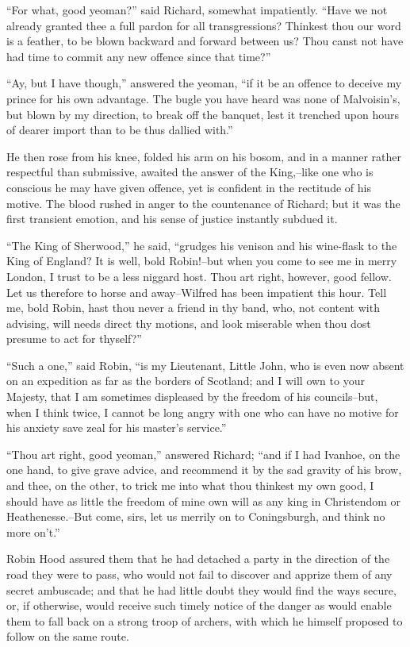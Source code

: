 ``For what, good yeoman?'' said Richard, somewhat impatiently. ``Have we
not already granted thee a full pardon for all transgressions? Thinkest
thou our word is a feather, to be blown backward and forward between us?
Thou canst not have had time to commit any new offence since that
time?''

``Ay, but I have though,'' answered the yeoman, ``if it be an offence to
deceive my prince for his own advantage. The bugle you have heard was
none of Malvoisin's, but blown by my direction, to break off the
banquet, lest it trenched upon hours of dearer import than to be thus
dallied with.''

He then rose from his knee, folded his arm on his bosom, and in a manner
rather respectful than submissive, awaited the answer of the King,--like
one who is conscious he may have given offence, yet is confident in the
rectitude of his motive. The blood rushed in anger to the countenance of
Richard; but it was the first transient emotion, and his sense of
justice instantly subdued it.

``The King of Sherwood,'' he said, ``grudges his venison and his
wine-flask to the King of England? It is well, bold Robin!--but when you
come to see me in merry London, I trust to be a less niggard host. Thou
art right, however, good fellow. Let us therefore to horse and
away--Wilfred has been impatient this hour. Tell me, bold Robin, hast
thou never a friend in thy band, who, not content with advising, will
needs direct thy motions, and look miserable when thou dost presume to
act for thyself?''

``Such a one,'' said Robin, ``is my Lieutenant, Little John, who is even
now absent on an expedition as far as the borders of Scotland; and I
will own to your Majesty, that I am sometimes displeased by the freedom
of his councils--but, when I think twice, I cannot be long angry with
one who can have no motive for his anxiety save zeal for his master's
service.''

``Thou art right, good yeoman,'' answered Richard; ``and if I had
Ivanhoe, on the one hand, to give grave advice, and recommend it by the
sad gravity of his brow, and thee, on the other, to trick me into what
thou thinkest my own good, I should have as little the freedom of mine
own will as any king in Christendom or Heathenesse.--But come, sirs, let
us merrily on to Coningsburgh, and think no more on't.''

Robin Hood assured them that he had detached a party in the direction of
the road they were to pass, who would not fail to discover and apprize
them of any secret ambuscade; and that he had little doubt they would
find the ways secure, or, if otherwise, would receive such timely notice
of the danger as would enable them to fall back on a strong troop of
archers, with which he himself proposed to follow on the same route.

